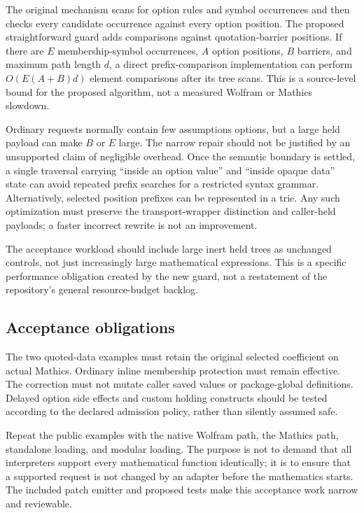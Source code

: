 \documentclass[11pt,letterpaper]{article}
\newcommand{\code}[1]{\texttt{\detokenize{#1}}}
\begin{document}
The original mechanism scans for option rules and symbol occurrences and then
checks every candidate occurrence against every option position. The proposed
straightforward guard adds comparisons against quotation-barrier positions.
If there are $E$ membership-symbol occurrences, $A$ option positions, $B$
barriers, and maximum path length $d$, a direct prefix-comparison implementation
can perform $O(E(A+B)d)$ element comparisons after its tree scans. This is a
source-level bound for the proposed algorithm, not a measured Wolfram or
Mathics slowdown.

Ordinary requests normally contain few assumptions options, but a large held
payload can make $B$ or $E$ large. The narrow repair should not be justified by
an unsupported claim of negligible overhead. Once the semantic boundary is
settled, a single traversal carrying ``inside an option value'' and ``inside
opaque data'' state can avoid repeated prefix searches for a restricted syntax
grammar. Alternatively, selected position prefixes can be represented in a
trie. Any such optimization must preserve the transport-wrapper distinction
and caller-held payloads; a faster incorrect rewrite is not an improvement.

The acceptance workload should include large inert held trees as unchanged
controls, not just increasingly large mathematical expressions. This is a
specific performance obligation created by the new guard, not a restatement
of the repository's general resource-budget backlog.

\subsection{Acceptance obligations}

The two quoted-data examples must retain the original selected coefficient on
actual Mathics. Ordinary inline membership protection must remain effective.
The correction must not mutate caller saved values or package-global
\code{System} definitions. Delayed option side effects and custom holding
constructs should be tested according to the declared admission policy,
rather than silently assumed safe.

Repeat the public examples with the native Wolfram path, the Mathics path,
standalone loading, and modular loading. The purpose is not to demand that all
interpreters support every mathematical function identically; it is to ensure
that a supported request is not changed by an adapter before the mathematics
starts. The included patch emitter and proposed tests make this acceptance
work narrow and reviewable.
\end{document}
